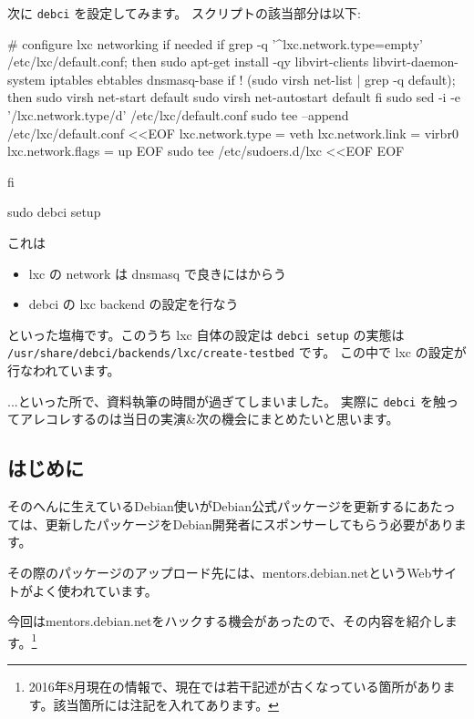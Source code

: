 \documentclass[mingoth,a4paper]{jsarticle}
\begin{document}
次に \texttt{debci} を設定してみます。
スクリプトの該当部分は以下:
\begin{commandline}
# configure lxc networking if needed
if grep -q '^lxc.network.type\s*=\s*empty' /etc/lxc/default.conf; then
  sudo apt-get install -qy libvirt-clients libvirt-daemon-system iptables ebtables dnsmasq-base
  if ! (sudo virsh net-list | grep -q default); then
    sudo virsh net-start default
    sudo virsh net-autostart default
  fi
  sudo sed -i -e '/lxc.network.type/d' /etc/lxc/default.conf
  sudo tee --append /etc/lxc/default.conf <<EOF
lxc.network.type = veth
lxc.network.link = virbr0
lxc.network.flags = up
EOF
  sudo tee /etc/sudoers.d/lxc <<EOF
EOF

fi

sudo debci setup
\end{commandline}
これは
\begin{itemize}
\item %
  lxc の network は dnsmasq で良きにはからう
\item %
  debci の lxc backend の設定を行なう
\end{itemize}
といった塩梅です。このうち lxc 自体の設定は
\texttt{debci setup} の実態は
\texttt{/usr/share/debci/backends/lxc/create-testbed} です。
この中で lxc の設定が行なわれています。

...といった所で、資料執筆の時間が過ぎてしまいました。
実際に \texttt{debci} を触ってアレコレするのは当日の実演\&次の機会にまとめたいと思います。


\subsection{はじめに}

そのへんに生えているDebian使いがDebian公式パッケージを更新するにあたっては、更新したパッケージをDebian開発者にスポンサーしてもらう必要があります。

その際のパッケージのアップロード先には、mentors.debian.netというWebサイトがよく使われています。

今回はmentors.debian.netをハックする機会があったので、その内容を紹介します。\footnote{2016年8月現在の情報で、現在では若干記述が古くなっている箇所があります。該当箇所には注記を入れてあります。}
\end{document}
